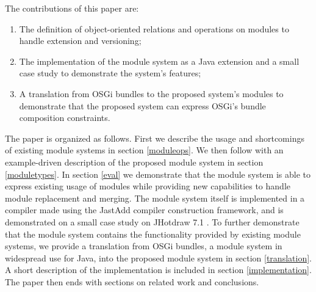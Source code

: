 The contributions of this paper are:

\begin{enumerate}
\item  The definition of object-oriented relations and operations on modules to 
handle extension and versioning;
\item The implementation of the module system as a Java extension and a
small case study to demonstrate the system's features;
\item A translation from OSGi bundles to the proposed system's modules to
demonstrate that the proposed system can express OSGi's bundle composition constraints.
\end{enumerate}

The paper is organized as follows. First we describe the
usage and shortcomings of existing module systems in section \ref{moduleops}. 
We then follow with an example-driven description of the proposed module system in section \ref{moduletypes}. 
In section \ref{eval} we demonstrate that the module
system is able to express existing usage of modules while providing new
capabilities to handle module replacement and merging. The module system
itself is implemented in a compiler made using the JastAdd\cite{jastadd} compiler construction
framework, and is demonstrated on a small case study on JHotdraw 7.1 \cite{jhotdraw}.
To further demonstrate that the module system contains the functionality provided by existing
module systems, we provide a translation from OSGi bundles, a module system in widespread
use for Java, into the proposed module system in section \ref{translation}.
A short description of the implementation is included in section \ref{implementation}.
The paper then ends with sections on related work and conclusions.
